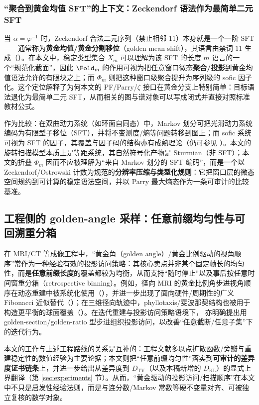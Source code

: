 \subsubsection{“聚合到黄金均值 SFT”的上下文：Zeckendorf 语法作为最简单二元 SFT}
当 \(\alpha=\varphi^{-1}\) 时，Zeckendorf 合法二元序列（禁止相邻 \(11\)）本身就是一个一阶 SFT——通常称为\textbf{黄金均值/黄金分割移位}（golden mean shift），其语言由禁词 \(11\) 生成（\cite{LindMarcus1995,Kitchens1998SymbolicDynamics}）。在本文中，稳定类型集合 \(X_m\) 可以理解为该 SFT 的长度 \(m\) 语言的一个“规范化截面”，因此 \(\Fold_m\) 的作用可视为把任意窗口微态\textbf{聚合/投影}到黄金均值语法允许的有限块之上；而 \(\Phi_m\) 则把这种窗口级聚合提升为序列级的 sofic 因子化。这个定位解释了为何本文的 PF/Parry/\(\zeta\) 接口在黄金分支上特别简单：目标语法退化为最简单二元 SFT，从而相关的图与谱对象可以写成闭式并直接对照标准教材公式。

作为比较：在双曲动力系统（如环面自同态）中，Markov 划分可把光滑动力系统编码为有限型子移位（SFT），并将不变测度/熵等问题转移到图上；而 sofic 系统可视为 SFT 的因子，其覆盖与因子码的结构亦有成熟理论（仍可参见 \cite{LindMarcus1995}）。本文的旋转扫描模型本质上是等距系统，其自然符号化产物是 Sturmian（非 SFT）；本文的折叠 $\Phi_m$ 因而不应被理解为“来自 Markov 划分的 SFT 编码”，而是一个以 Zeckendorf/Ostrowski 计数为规范的\textbf{分辨率压缩与类型化规则}：它把窗口层的微态空间规约到可计算的稳定语法空间，并以 Parry 最大熵态作为一条可审计的比较基准。

\subsection{工程侧的 golden-angle 采样：任意前缀均匀性与可回溯重分箱}

在 MRI/CT 等成像工程中，“黄金角（golden angle）/黄金比例驱动的视角顺序”常作为一种经验有效的投影访问策略：其核心卖点并非某个固定帧长的均匀性，而是\textbf{任意前缀长度}的覆盖都较为均衡，从而支持“随时停止”以及事后按任意时间窗重分箱（retrospective binning）。例如，径向 MRI 的黄金比例角步进视角顺序在动态重建中被系统化使用（\cite{Winkelmann2007GoldenRatioRadialMRI,Feng2014GRASP}），并进一步出现了面向硬件/周期性的广义 Fibonacci 近似替代（\cite{Wundrak2015FibonacciSurrogateGoldenAngle}）；在三维径向轨迹中，phyllotaxis/斐波那契结构也被用于构造更平衡的球面覆盖（\cite{Piccini2011SpiralPhyllotaxis}）。在迭代重建与投影访问策略语境下，\cite{Koehler2004GoldenSectionProjectionAccess} 亦明确提出用 golden-section/golden-ratio 型步进组织投影访问，以改善“任意截断/任意子集”下的迭代行为。

本文的工作与上述工程路线的关系是互补的：工程文献多以点扩散函数/旁瓣与重建稳定性的数值经验为主要论据；本文则把“任意前缀均匀性”落实到\textbf{可审计的差异度证书链条}上，并进一步给出从差异度到 \(D_{\mathrm{TV}}\)（以及本稿新增的 \(D_{\mathrm{KL}}\)）的显式上界翻译（第 \ref{sec:experiments} 节）。从而，“黄金驱动的投影访问/扫描顺序”在本文中不只是启发性经验法则，而是与连分数/Markov 常数等硬不变量对齐、可被独立复核的数学对象。

